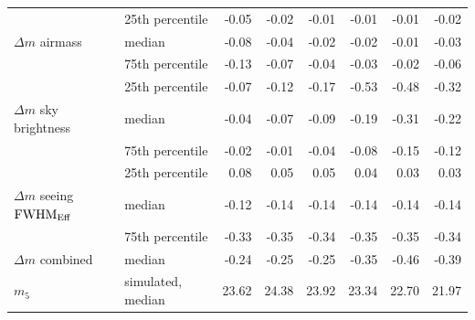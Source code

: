 \documentclass[PST,authoryear,toc]{lsstdoc}
\newcommand{\mf}{\ensuremath{m_5}}
\newcommand{\fwhme}{\ensuremath{{\rm FWHM}_\mathrm{Eff}}}
\begin{document}
\begin{table}
\begin{tabular}{llrrrrrr}
\hline
\hline
 &25th percentile       &   -0.05 &   -0.02 &   -0.01 &   -0.01 &   -0.01 &   -0.02 \\
$\Delta m$ airmass &median                &   -0.08 &   -0.04 &   -0.02 &   -0.02 &   -0.01 &   -0.03 \\
&75th percentile       &   -0.13 &   -0.07 &   -0.04 &   -0.03 &   -0.02 &   -0.06 \\
\hline
 &25th percentile &   -0.07 &   -0.12 &   -0.17 &   -0.53 &   -0.48 &   -0.32 \\
$\Delta m$ sky brightness& median          &   -0.04 &   -0.07 &   -0.09 &   -0.19 &   -0.31 &   -0.22 \\
 &75th percentile &   -0.02 &   -0.01 &   -0.04 &   -0.08 &   -0.15 &   -0.12 \\
\hline
&25th percentile &  0.08 &  0.05 &  0.05 &  0.04 &  0.03 &  0.03 \\
$\Delta m$ seeing \fwhme &median          &   -0.12 &   -0.14 &   -0.14 &   -0.14 &   -0.14 &   -0.14 \\
 &75th percentile &   -0.33 &   -0.35 &   -0.34 &   -0.35 &   -0.35 &   -0.34 \\
 \hline
 $\Delta m$ {combined} &median          &   -0.24 &   -0.25 &   -0.25 &   -0.35 &   -0.46 &   -0.39 \\

\hline
\hline
\mf\ & simulated, median                      &  23.62 &  24.38 &  23.92 &  23.34 &  22.70 &  21.97 \\
\hline

\hline
\end{tabular}
\end{table}


 \FloatBarrier
\end{document}

